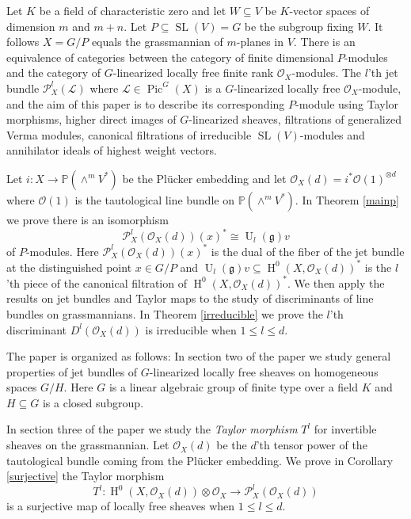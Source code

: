 \documentclass{amsart}
\theoremstyle{plain}
\theoremstyle{definition}
\theoremstyle{remark}
\numberwithin{equation}{theorem}
\begin{document}
Let $K$ be a field of characteristic zero and let
  $W\subseteq V$ be $K$-vector spaces of dimension $m$ and $m+n$. Let
  $P\subseteq {\operatorname{SL}}(V)=G$ be the subgroup fixing $W$. It follows
  $X=G/P$ equals the grassmannian of $m$-planes in $V$. There is an
  equivalence of categories between the category of finite dimensional
  $P$-modules and the category of $G$-linearized locally free finite rank
  ${\mathcal{O} }_{X}$-modules. The $l$'th jet bundle ${\mathcal{P} }^l_X({\mathcal{L}})$ where
  ${\mathcal{L}}\in {\operatorname{Pic} }^{G}(X)$ is a $G$-linearized locally free ${\mathcal{O} }_X$-module, and the aim of this paper is to
  describe its corresponding $P$-module using Taylor morphisms, higher direct images of
$G$-linearized sheaves, filtrations of generalized Verma modules,
canonical filtrations of irreducible ${\operatorname{SL}}(V)$-modules and annihilator ideals of
highest weight vectors. 

Let $i:X\rightarrow {\mathbb{P}}(\wedge^m V^*)$ be the
Pl\"{u}cker embedding and let ${\mathcal{O} }_X(d)=i^*{\mathcal{O} }(1)^{\otimes d}$ where ${\mathcal{O} }(1)$
is the tautological line bundle on ${\mathbb{P}}(\wedge^m V^*)$.
In Theorem \ref{mainp} we prove there is an isomorphism
\[ {\mathcal{P} }^l_X({\mathcal{O} }_X(d))(x)^*\cong {\operatorname{U}}_l({\mathfrak{g}})v \]
of $P$-modules. Here ${\mathcal{P} }^l_X({\mathcal{O} }_X(d))(x)^*$ is the dual of the fiber
of the jet bundle at the distinguished point $x\in G/P$  and
${\operatorname{U}}_l({\mathfrak{g}})v\subseteq {\operatorname{H} }^0(X,{\mathcal{O} }_X(d))^*$ is the $l$'th piece of the
canonical filtration of ${\operatorname{H} }^0(X,{\mathcal{O} }_X(d))^*$.
We then apply the results on jet bundles and Taylor maps to the study of discriminants of
line bundles on grassmannians. In Theorem \ref{irreducible} we prove
the $l$'th discriminant $D^l({\mathcal{O} }_X(d))$ is irreducible when $1\leq l
\leq d$.

The paper is organized as follows:
In section two of the paper we study general properties of jet bundles
of $G$-linearized locally free sheaves on homogeneous spaces
$G/H$. Here $G$ is a linear algebraic group of finite type over a
field $K$ and $H\subseteq G$ is a closed subgroup.

In section three of the paper we study the \emph{Taylor morphism}
$T^l$ for invertible sheaves on the grassmannian.
Let  ${\mathcal{O} }_X(d)$ be the $d$'th tensor power of the tautological bundle
coming from the Pl\"{u}cker embedding. 
We prove in Corollary \ref{surjective} the Taylor morphism 
\[ T^l:{\operatorname{H} }^0(X,{\mathcal{O} }_X(d))\otimes {\mathcal{O} }_X\rightarrow {\mathcal{P} }^l_X({\mathcal{O} }_X(d)) \]
is a surjective map of locally free sheaves when $1\leq l \leq d$.
\end{document}
